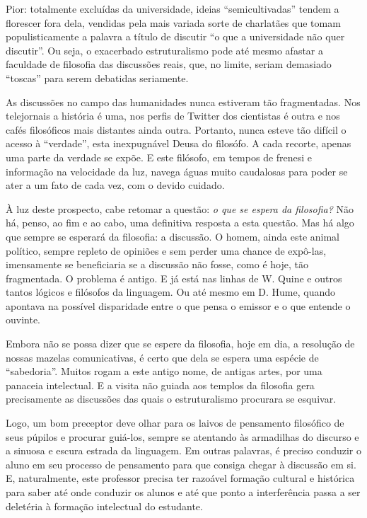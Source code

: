 \documentclass[12pt,a4paper]{article}
\begin{document}
	\newpage

	Pior: totalmente excluídas da universidade, ideias “semicultivadas”
	tendem a florescer fora dela, vendidas pela mais variada sorte de 
	charlatães que tomam populisticamente a palavra a título de discutir 
	“o que a universidade não quer discutir”. Ou seja, o exacerbado 
	estruturalismo pode até mesmo afastar a faculdade de filosofia das 
	discussões reais, que, no limite, seriam demasiado “toscas” para serem 
	debatidas seriamente. 

	As discussões no campo das humanidades nunca estiveram tão 
	fragmentadas. Nos telejornais a história é uma, nos perfis de Twitter 
	dos cientistas é outra e nos cafés filosóficos mais distantes ainda 
	outra. Portanto, nunca esteve tão difícil o acesso à “verdade”, esta 
	inexpugnável Deusa do filosófo. A cada recorte, apenas uma parte da 
	verdade se expõe. E este filósofo, em tempos de frenesi e informação 
	na velocidade da luz, navega águas muito caudalosas para poder se 
	ater a um fato de cada vez, com o devido cuidado.  

	À luz deste prospecto, cabe retomar a questão: \textit{o que se espera 
	da filosofia?} Não há, penso, ao fim e ao cabo, uma definitiva 
	resposta a esta questão. Mas há algo que sempre se esperará da 
	filosofia: a discussão. O homem, ainda este animal político, sempre 
	repleto de opiniões e sem perder uma chance de expô-las, imensamente 
	se beneficiaria se a discussão não fosse, como é hoje, tão fragmentada. 
	O problema é antigo. E já está nas linhas de W. Quine e outros tantos 
	lógicos e filósofos da linguagem. Ou até mesmo em D. Hume, quando 
	apontava na possível disparidade entre o que pensa o emissor e o que 
	entende o ouvinte. 

	Embora não se possa dizer que se espere da filosofia, hoje em dia, 
	a resolução de nossas mazelas comunicativas, é certo que dela se 
	espera uma espécie de “sabedoria”. Muitos rogam a este antigo nome, 
	de antigas artes, por uma panaceia intelectual. E a visita não 
	guiada aos templos da filosofia gera precisamente as discussões das 
	quais o estruturalismo procurara se esquivar. 

	Logo, um bom preceptor deve olhar para os laivos de pensamento 
	filosófico de seus púpilos e procurar guiá-los, sempre se atentando 
	às armadilhas do discurso e a sinuosa e escura estrada da linguagem. 
	Em outras palavras, é preciso conduzir o aluno em seu processo de 
	pensamento para que consiga chegar à discussão em si. E, naturalmente, 
	este professor precisa ter razoável formação cultural e histórica 
	para saber até onde conduzir os alunos e até que ponto a interferência 
	passa a ser deletéria à formação intelectual do estudante. 
\end{document}
